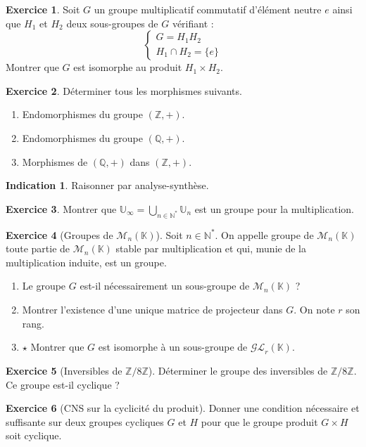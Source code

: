 \documentclass[french]{book}
\newcommand{\N}{\mathbb{N}}
\newcommand{\Z}{\mathbb{Z}}
\newcommand{\Q}{\mathbb{Q}}
\newcommand{\K}{\mathbb{K}}
\newcommand{\U}{\mathbb{U}}
\newcommand{\st}{^*}
\theoremstyle{definition}
\newtheorem{ex}{Exercice}[chapter]
\theoremstyle{theorem}
\newtheorem*{ind}{Indication}
\theoremstyle{remark}
\begin{document}
\begin{ex}
	Soit $G$ un groupe multiplicatif commutatif d'élément neutre $e$ ainsi que $H_1$ et $H_2$ deux sous-groupes de $G$ vérifiant : $$\begin{cases}
		G=H_1H_2 \\
		H_1\cap H_2=\{e\}
	\end{cases}$$ Montrer que $G$ est isomorphe au produit $H_1\times H_2$.
\end{ex}

\begin{ex}
	Déterminer tous les morphismes suivants.
	\begin{enumerate}
		\item Endomorphismes du groupe $(\Z,+)$.
		\item Endomorphismes du groupe $(\Q,+)$.
		\item Morphismes de $(\Q,+)$ dans $(\Z,+)$.
	\end{enumerate}
\end{ex}

\begin{ind}
	Raisonner par analyse-synthèse.
\end{ind}

\begin{ex}
	Montrer que $\U_\infty=\displaystyle\bigcup_{n\in\N\st} \U_n$ est un groupe pour la multiplication.
\end{ex}

\begin{ex}[Groupes de $\mathcal{M}_n(\K)$]
	Soit $n\in\N\st$. On appelle groupe de $\mathcal{M}_n(\K)$ toute partie de $\mathcal{M}_n(\K)$ stable par multiplication et qui, munie de la multiplication induite, est un groupe.
	\begin{enumerate}
		\item Le groupe $G$ est-il nécessairement un sous-groupe de $\mathcal{M}_n(\K)$ ?
		\item Montrer l'existence d'une unique matrice de projecteur dans $G$. On note $r$ son rang.
		\item $\star$ Montrer que $G$ est isomorphe à un sous-groupe de $\mathcal{GL}_r(\K)$.		
	\end{enumerate}
\end{ex}

\begin{ex}[Inversibles de $\Z/8\Z$]
	Déterminer le groupe des inversibles de $\Z/8\Z$. Ce groupe est-il cyclique ?
\end{ex}

\begin{ex}[CNS sur la cyclicité du produit]
	Donner une condition nécessaire et suffisante sur deux groupes cycliques $G$ et $H$ pour que le groupe produit $G\times H$ soit cyclique.
\end{ex}
\end{document}
